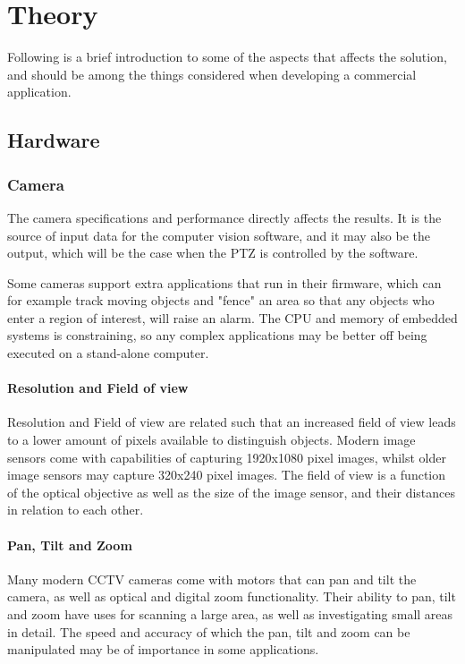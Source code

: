 \chapter{Theory}
Following is a brief introduction to some of the aspects that affects the solution, and should be among the things considered when developing a commercial application.

\section{Hardware}
\subsection{Camera}
The camera specifications and performance directly affects the results. It is the source of input data for the computer vision software, and it may also be the output, which will be the case when the PTZ is controlled by the software.

Some cameras support extra applications that run in their firmware, which can for example track moving objects and "fence" an area so that any objects who enter a region of interest, will raise an alarm.
The CPU and memory of embedded systems is constraining, so any complex applications may be better off being executed on a stand-alone computer.

\subsubsection{Resolution and Field of view}
Resolution and Field of view are related such that an increased field of view leads to a lower amount of pixels available to distinguish objects. Modern image sensors come with capabilities of capturing 1920x1080 pixel images, whilst older image sensors may capture 320x240 pixel images.
The field of view is a function of the optical objective as well as the size of the image sensor, and their distances in relation to each other.

\subsubsection{Pan, Tilt and Zoom}
Many modern CCTV cameras come with motors that can pan and tilt the camera, as well as optical and digital zoom functionality. Their ability to pan, tilt and zoom have uses for scanning a large area, as well as investigating small areas in detail.
The speed and accuracy of which the pan, tilt and zoom can be manipulated may be of importance in some applications.

